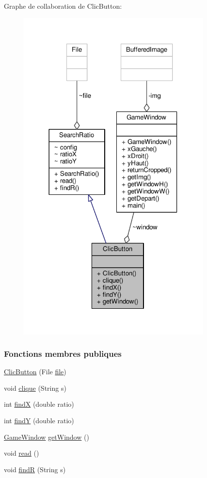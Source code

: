 Graphe de collaboration de Clic\+Button\+:\nopagebreak
\begin{figure}[H]
\begin{center}
\leavevmode
\includegraphics[width=278pt]{classClicButton__coll__graph}
\end{center}
\end{figure}
\subsubsection*{Fonctions membres publiques}
\begin{DoxyCompactItemize}
\item 
\hyperlink{classClicButton_a836009909fefe19c4c9232d5e8e9c926}{Clic\+Button} (File \hyperlink{classSearchRatio_a06393eaf84ff3e3f8c7f48e91b0b5e6a}{file})
\item 
void \hyperlink{classClicButton_ae6aa14adab27c29bff260ca38698f080}{clique} (String s)
\item 
int \hyperlink{classClicButton_ad41856b68437ce1373daac34f28161b6}{find\+X} (double ratio)
\item 
int \hyperlink{classClicButton_a838800b9bf1a7c4f7aed638c3401c3e0}{find\+Y} (double ratio)
\item 
\hyperlink{classGameWindow}{Game\+Window} \hyperlink{classClicButton_abeb3ae6fad1eccc494352fea4c34cd57}{get\+Window} ()
\item 
void \hyperlink{classSearchRatio_a03de53bdc48b4718858ef22d1ada2abd}{read} ()
\item 
void \hyperlink{classSearchRatio_a7c19f67d1f2ef6275d1a84bfdd3b2112}{find\+R} (String s)
\end{DoxyCompactItemize}

